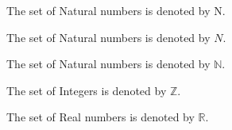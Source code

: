 \documentclass[11pt]{article}
\begin{document}
The set of Natural numbers is denoted by N.

The set of Natural numbers is denoted by $N$.

The set of Natural numbers is denoted by $\mathbb{N}$.

The set of Integers is denoted by $\mathbb{Z}$.

The set of Real numbers is denoted by $\mathbb{R}$.
\end{document}
